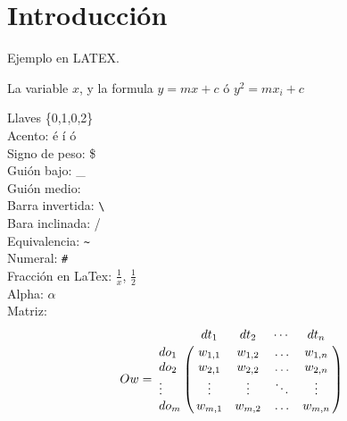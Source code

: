 \documentclass[a4paper, 12pt]{article}
\begin{document}
\section{Introducción}
 Ejemplo en LATEX. 

La variable $x$, y la formula \( y = m x + c \) ó $y^2=mx_i+c$

Llaves \{0,1,0,2\}  \\ %
Acento: \'e \'i \'o \\
Signo de peso: \$ \\
Guión bajo: \_ \\
Guión medio: \- \\
Barra invertida: \verb'\' \\
Bara inclinada: / \\
Equivalencia: \verb'~' \\
Numeral: \verb'#' \\
Fracción en LaTex: $\frac{1}{x}$,   $\frac{1}{2}$ \\
Alpha: $\alpha$\\
Matriz:
$$
Ow = \bordermatrix{
              & dt_1     & dt_2     & \cdots & dt_n     \cr
    do_1     & {w_{1,1}}    & {w_{1,2}}     & \ldots & {w_{1,n}}    \cr
    do_2     & {w_{2,1}}     & {w_{2,2}}     & \ldots & {w_{2,n}}     \cr
    \vdots & \vdots & \vdots & \ddots & \vdots \cr
    do_m     & {w_{m,1}}    & {w_{m,2}}      & \ldots  & {w_{m,n}}      \cr
}
$$
\end{document}
